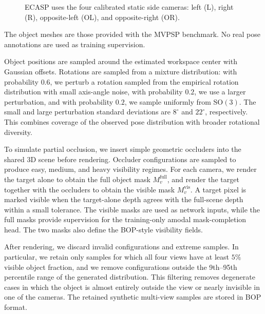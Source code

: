 
\begin{figure}[!htbp]
    \centering
    \caption{ECASP uses the four calibrated static side cameras: left (L), right (R), opposite-left (OL), and opposite-right (OR).}

    \label{fig:camera_setup}
\end{figure}


\label{supp:synthetic_data}

The object meshes are those provided with the MVPSP benchmark.
No real pose annotations are used as training supervision.

Object positions are sampled around the estimated workspace center with
Gaussian offsets. Rotations are sampled from a mixture distribution: with
probability \(0.6\), we perturb a rotation sampled from the empirical
rotation distribution with small axis-angle noise, with probability \(0.2\),
we use a larger perturbation, and with probability \(0.2\), we sample
uniformly from \(\mathrm{SO}(3)\). The small and large perturbation
standard deviations are \(8^\circ\) and \(22^\circ\), respectively. This
combines coverage of the observed pose distribution with broader
rotational diversity.

To simulate partial occlusion, we insert simple geometric occluders into
the shared 3D scene before rendering. Occluder configurations are sampled
to produce easy, medium, and heavy visibility regimes. For each camera, we
render the target alone to obtain the full object mask
\(M_v^{\mathrm{full}}\), and render the target together with the occluders
to obtain the visible mask \(M_v^{\mathrm{vis}}\). A target pixel is marked
visible when the target-alone depth agrees with the full-scene depth within
a small tolerance. The visible masks are used as network inputs, while the
full masks provide supervision for the training-only amodal
mask-completion head. The two masks also define the BOP-style visibility
fields.

After rendering, we discard invalid configurations and extreme samples.
In particular, we retain only samples for which all four views have at
least \(5\%\) visible object fraction, and we remove configurations outside
the 9th--95th percentile range of the generated distribution.
This filtering removes degenerate cases in which the object is almost entirely outside the
view or nearly invisible in one of the cameras. The retained synthetic multi-view samples are stored in BOP format.

